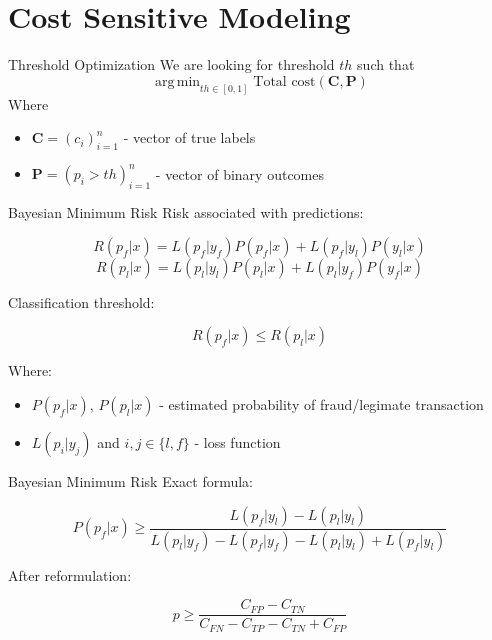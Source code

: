 \documentclass[10pt]{beamer}
\DeclareMathOperator*{\argmin}{arg\,min}
\begin{document}
\section{Cost Sensitive Modeling}

\begin{frame}{Threshold Optimization}
    We are looking for threshold $th$ such that
    $$ \argmin_{th \in [0,1]} \text{Total cost}(\boldsymbol{C}, \boldsymbol{P}) $$
    Where 
    \begin{itemize}
        \item $ \boldsymbol{C} = (c_i)_{i=1}^n $ - vector of true labels
        \item $ \boldsymbol{P} = (p_i > th)_{i=1}^n $ - vector of binary outcomes
    \end{itemize}{}
\end{frame}{}

\begin{frame}{Bayesian Minimum Risk}
    Risk associated with predictions:
    
    $$ R(p_f|x) = L(p_f|y_f)P(p_f|x) + L(p_f|y_l)P(y_l|x) $$
    $$ R(p_l|x) = L(p_l|y_l)P(p_l|x) + L(p_l|y_f)P(y_f|x) $$
    
    Classification threshold:
    
    $$ R(p_f|x) \leq R(p_l|x)$$
    
    Where:
    
    \begin{itemize}
        \item $P(p_f|x)$, $P(p_l|x)$ - estimated probability of fraud/legimate transaction
        \item $L(p_{i}|y_{j})$ and $i,j \in \{l,f\}$ - loss function
    \end{itemize}{}

\end{frame}{}

\begin{frame}{Bayesian Minimum Risk}
    Exact formula:
    
    $$ P(p_f|x) \ge \frac{L(p_f|y_l) - L(p_l|y_l)}{L(p_l|y_f) - L(p_f|y_f) - L(p_l|y_l) + L(p_f|y_l)}$$
    
    After reformulation:
    
    $$ p \ge \frac{C_{FP} - C_{TN}}{C_{FN} - C_{TP} - C_{TN} + C_{FP}}$$
    
\end{frame}{}
\end{document}
